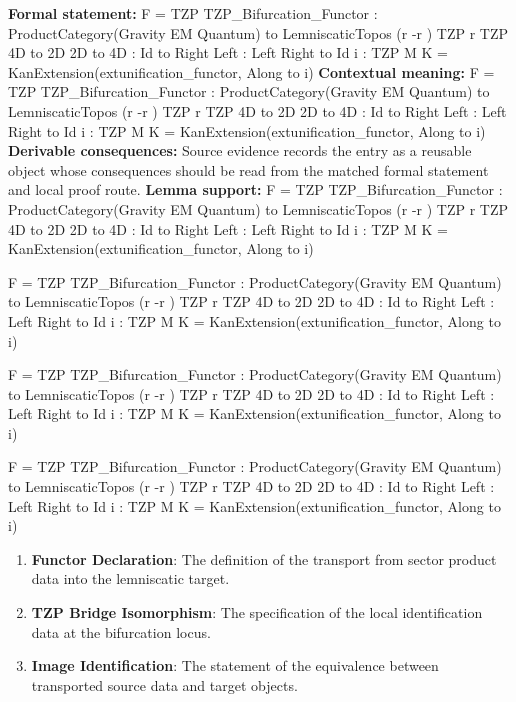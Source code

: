 \begingroup\footnotesize\setlength{\emergencystretch}{3em}\sloppy
\textbf{Formal statement:} F = TZP TZP\_Bifurcation\_Functor : ProductCategory(Gravity   EM   Quantum) to LemniscaticTopos  (r -r ) TZP r TZP 4D to 2D 2D to 4D   : Id to Right  Left   : Left  Right to Id i : TZP  M K = KanExtension(extunification\_functor, Along to i)
\textbf{Contextual meaning:} F = TZP TZP\_Bifurcation\_Functor : ProductCategory(Gravity   EM   Quantum) to LemniscaticTopos  (r -r ) TZP r TZP 4D to 2D 2D to 4D   : Id to Right  Left   : Left  Right to Id i : TZP  M K = KanExtension(extunification\_functor, Along to i)
\textbf{Derivable consequences:} Source evidence records the entry as a reusable object whose consequences should be read from the matched formal statement and local proof route.
\textbf{Lemma support:} F = TZP TZP\_Bifurcation\_Functor : ProductCategory(Gravity   EM   Quantum) to LemniscaticTopos  (r -r ) TZP r TZP 4D to 2D 2D to 4D   : Id to Right  Left   : Left  Right to Id i : TZP  M K = KanExtension(extunification\_functor, Along to i)\par
\endgroup

F = TZP TZP\_Bifurcation\_Functor : ProductCategory(Gravity   EM   Quantum) to LemniscaticTopos  (r -r ) TZP r TZP 4D to 2D 2D to 4D   : Id to Right  Left   : Left  Right to Id i : TZP  M K = KanExtension(extunification\_functor, Along to i)

F = TZP TZP\_Bifurcation\_Functor : ProductCategory(Gravity   EM   Quantum) to LemniscaticTopos  (r -r ) TZP r TZP 4D to 2D 2D to 4D   : Id to Right  Left   : Left  Right to Id i : TZP  M K = KanExtension(extunification\_functor, Along to i)

F = TZP TZP\_Bifurcation\_Functor : ProductCategory(Gravity   EM   Quantum) to LemniscaticTopos  (r -r ) TZP r TZP 4D to 2D 2D to 4D   : Id to Right  Left   : Left  Right to Id i : TZP  M K = KanExtension(extunification\_functor, Along to i)
\endgroup

\begin{enumerate}[leftmargin=1.6em,itemsep=6pt,topsep=4pt]
\item \textbf{Functor Declaration}: The definition of the transport from sector product data into the lemniscatic target.
\item \textbf{TZP Bridge Isomorphism}: The specification of the local identification data at the bifurcation locus.
\item \textbf{Image Identification}: The statement of the equivalence between transported source data and target objects.
\end{enumerate}

